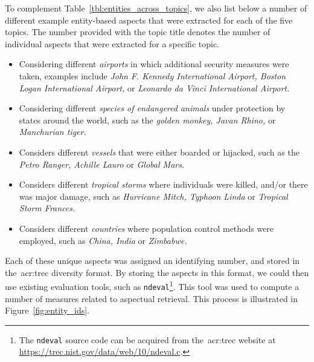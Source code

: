 To complement Table~\ref{tbl:entities_across_topics}, we also list below a number of different example entity-based aspects that were extracted for each of the five topics. The number provided with the topic title denotes the number of individual aspects that were extracted for a specific topic.

\begin{itemize}
    \item{ Considering different \emph{airports} in which additional security measures were taken, examples include \emph{John F. Kennedy International Airport, Boston Logan International Airport,} or \emph{Leonardo da Vinci International Airport.}}
    \item{ Considering different \emph{species of endangered animals} under protection by states around the world, such as the \emph{golden monkey, Javan Rhino,} or \emph{Manchurian tiger.}}
    \item{ Considers different \emph{vessels} that were either boarded or hijacked, such as the \emph{Petro Ranger, Achille Lauro} or \emph{Global Mars.}}
    \item{ Considers different \emph{tropical storms} where individuals were killed, and/or there was major damage, such as \emph{Hurricane Mitch, Typhoon Linda} or \emph{Tropical Storm Frances.}}
    \item{ Considers different \emph{countries} where population control methods were employed, such as \emph{China, India} or \emph{Zimbabwe.}}
\end{itemize}

Each of these unique aspects was assigned an identifying number, and stored in the~\gls{acr:trec} diversity format. By storing the aspects in this format, we could then use existing evaluation tools, such as \texttt{ndeval}\footnote{The \texttt{ndeval} source code can be acquired from the~\gls{acr:trec} website at \url{https://trec.nist.gov/data/web/10/ndeval.c}. }. This tool was used to compute a number of measures related to aspectual retrieval. This process is illustrated in Figure~\ref{fig:entity_ids}.

